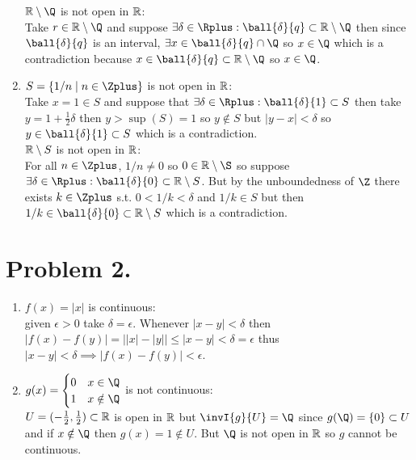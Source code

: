 \documentclass[12pt]{extarticle}
\begin{document}
\begin{enumerate}
$\R \setminus \Q$ is not open in $\mathbb{R}$: \\
Take $r \in \R \setminus \Q$ and suppose $\exists \delta \in \Rplus : \ball{\delta}{q} \subset \R \setminus \Q$ then since $\ball{\delta}{q}$ is an interval, $\exists x \in \ball{\delta}{q} \cap \Q$ so $x \in \Q$ which is a contradiction because $x \in \ball{\delta}{q} \subset \R \setminus \Q$ so $x \in \Q$. \\

\item $S = \{1/n \mid n \in \Zplus\}$ is not open in $\mathbb{R}$: \\
Take $x = 1 \in S$ and suppose that $\exists \delta \in \Rplus : \ball{\delta}{1} \subset S$ then take $y = 1 + \frac{1}{2} \delta$ then $y > \sup(S) = 1$ so $y \notin S$ but $|y - x| < \delta$ so $y \in \ball{\delta}{1} \subset S$ which is a contradiction. \\

$\mathbb{R} \setminus S$ is not open in $\mathbb{R}$: \\
For all $n \in \Zplus$, $1/n \neq 0$ so $0 \in \R \setminus \S$ so suppose $\exists \delta \in \Rplus : \ball{\delta}{0} \subset \R \setminus S$. But by the unboundedness of $\Z$ there exists $k \in \Zplus$ s.t. $0 < 1/k < \delta$ and $1/k \in S$ but then $1/k \in \ball{\delta}{0} \subset \R \setminus S$ which is a contradiction. \\

\end{enumerate}

\section*{Problem 2.}

\begin{enumerate}
\item $f(x) = |x|$ is continuous: \\
given $ \epsilon > 0$ take $\delta  = \epsilon$. Whenever $|x - y| < \delta$ then $|f(x) - f(y)| = \left||x| - |y|\right| \leq |x - y| < \delta = \epsilon$ thus $|x - y| < \delta  \implies |f(x) - f(y)| < \epsilon$.\\

\item $g(x) = \begin{cases} 
      0 & x \in \Q \\
      1 & x \notin \Q
   \end{cases}$ is not continuous: \\
   
$U = (-\frac{1}{2}, \frac{1}{2}) \subset \mathbb{R}$ is open in $\mathbb{R}$ but $\invI{g}{U} = \Q$ since $g(\Q) = \{0\} \subset U$ and if $x \notin \Q$ then $g(x) = 1 \notin U$. But $\Q$ is not open in $\mathbb{R}$ so $g$ cannot be continuous. 
\end{enumerate}
\end{document}
